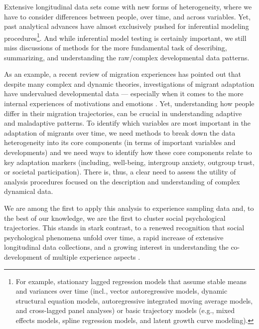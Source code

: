 \documentclass[man, 12pt, a4paper]{apa7}
\theoremstyle{break}
\theoremstyle{plain}
\begin{document}
Extensive longitudinal data sets come with new forms of heterogeneity, where we have to consider differences between people, over time, and across variables. Yet, past analytical advances have almost exclusively pushed for inferential modeling procedures\footnote{For example, stationary lagged regression models that assume stable means and variances over time (incl., vector autoregressive models, dynamic structural equation models, autoregressive integrated moving average models, and cross-lagged panel analyses) or basic trajectory models (e.g., mixed effects models, spline regression models, and latent growth curve modeling).}. And while inferential model testing is certainly important, we still miss discussions of methods for the more fundamental task of describing, summarizing, and understanding the raw/complex developmental data patterns.

As an example, a recent review of migration experiences has pointed out that despite many complex and dynamic theories, investigations of migrant adaptation have undervalued developmental data --- especially when it comes to the more internal experiences of motivations and emotions \citep[e.g.,][]{Kreienkamp2022d}. Yet, understanding how people differ in their migration trajectories, can be crucial in understanding adaptive and maladaptive patterns. To identify which variables are most important in the adaptation of migrants over time, we need methods to break down the data heterogeneity into its core components (in terms of important variables and developments) and we need ways to identify how these core components relate to key adaptation markers (including, well-being, intergroup anxiety, outgroup trust, or societal participation). There is, thus, a clear need to assess the utility of analysis procedures focused on the description and understanding of complex dynamical data. 

We are among the first to apply this analysis to experience sampling data and, to the best of our knowledge, we are the first to cluster social psychological trajectories. This stands in stark contrast, to a renewed recognition that social psychological phenomena unfold over time, a rapid increase of extensive longitudinal data collections, and a growing interest in understanding the co-development of multiple experience aspects \citep[e.g.,][]{Kreienkamp2022d, MacInnis2015, McKeown2017, Pettigrew2011, Ward2019}. 
\end{document}
